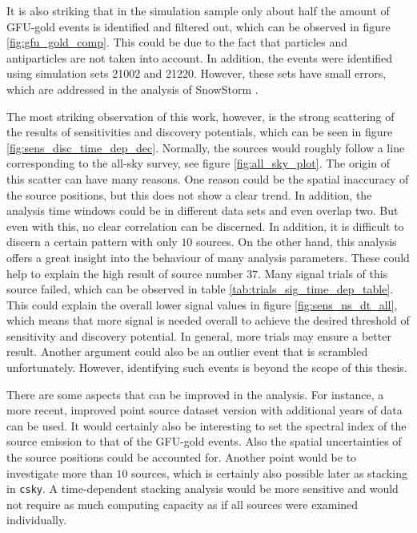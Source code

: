 It is also striking that in the simulation sample only about half the amount of GFU-gold events is identified and filtered out, which can be observed in figure \ref{fig:gfu_gold_comp}.
This could be due to the fact that particles and antiparticles are not taken into account.
In addition, the events were identified using simulation sets 21002 and 21220. However, these sets have small errors, which are addressed in the analysis of SnowStorm \cite{snowstorm}.

The most striking observation of this work, however, is the strong scattering of the results of sensitivities and discovery potentials, which can be seen in figure \ref{fig:sens_disc_time_dep_dec}.
Normally, the sources would roughly follow a line corresponding to the all-sky survey, see figure \ref{fig:all_sky_plot}.
The origin of this scatter can have many reasons. One reason could be the spatial inaccuracy of the source positions, but this does not show a clear trend.
In addition, the analysis time windows could be in different data sets and even overlap two.
But even with this, no clear correlation can be discerned.
In addition, it is difficult to discern a certain pattern with only $\num{10}$ sources.
On the other hand, this analysis offers a great insight into the behaviour of many analysis parameters.
These could help to explain the high result of source number $\num{37}$.
Many signal trials of this source failed, which can be observed in table \ref{tab:trials_sig_time_dep_table}.
This could explain the overall lower signal values in figure \ref{fig:sens_ns_dt_all}, which means that more signal is needed overall to achieve the desired threshold of sensitivity and discovery potential.
In general, more trials may ensure a better result.
Another argument could also be an outlier event that is scrambled unfortunately.
However, identifying such events is beyond the scope of this thesis.

There are some aspects that can be improved in the analysis.
For instance, a more recent, improved point source dataset version with additional years of data can be used.
It would certainly also be interesting to set the spectral index of the source emission to that of the GFU-gold events.
Also the spatial uncertainties of the source positions could be accounted for.
Another point would be to investigate more than $\num{10}$ sources, which is certainly also possible later as stacking in \texttt{csky}.
A time-dependent stacking analysis would be more sensitive and would not require as much computing capacity as if all sources were examined individually.

